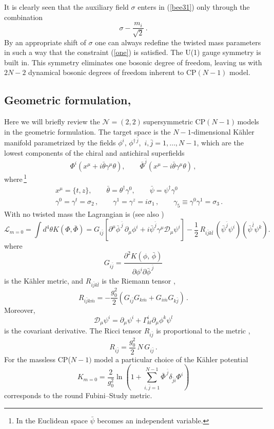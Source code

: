 \documentclass[epsfig,12pt]{article}
\def\beq{\begin{equation}}
\def\eeq{\end{equation}}
\def\beqn{\begin{eqnarray}}
\def\eeqn{\end{eqnarray}}
\newcommand{\ntt}{${\mathcal N}=(2,2)\,$}
\newcommand{\cpn}{CP$(N-1)\,$}
\newcommand{\cell}{{\mathcal L}}
\newcommand{\cde}{{\mathcal D}}
\def\beqn{\begin{eqnarray}}
\def\eeqn{\end{eqnarray}}
\def\beq{\begin{equation}}
\def\eeq{\end{equation}}
\begin{document}
It is clearly seen that the auxiliary field $\sigma$
enters in (\ref{bee31}) only through the  combination
\beq
\sigma -\frac{m_i}{\sqrt 2}\,.
\label{combi}
\eeq
By an appropriate shift of $\sigma$
one can always redefine the twisted mass parameters in such a way that the constraint
(\ref{one}) is satisfied.
The U(1) gauge symmetry is built in. This symmetry eliminates one bosonic degree of freedom, leaving us with $2N-2$ dynamical bosonic degrees of freedom inherent to CP$(N-1)$ model.



\subsection{Geometric formulation,  }

Here we will  briefly review the \ntt supersymmetric \cpn models in the
geometric formulation. 
The target space is the $N-1$-dimensional K\"ahler manifold 
parametrized by the fields $\phi^{i},\,\phi^{\dagger\,\bar j}$, $\,i,\bar j=1,\ldots,N-1$,
which are the lowest components of the chiral and antichiral superfields 
\beq
\Phi^{i}(x^{\mu}+i\bar \theta \gamma^{\mu} \theta),\qquad \bar\Phi^{\bar j}(x^{\mu}-i\bar \theta \gamma^{\mu} \theta)\,,
\label{wtpi4}
\eeq
where\,\footnote{In the Euclidean space $\bar\psi$ becomes an independent variable.}
\beqn
&&
x^{\mu}=\{t,z\},\qquad \bar \theta=\theta^{\dagger}\gamma^{0},\qquad \bar \psi=\psi^{\dagger}\gamma^{0}
\nonumber
\\[2mm]
&&\gamma^{0}=\gamma^t=\sigma_2\,,\qquad \gamma^{1}=\gamma^z = i\sigma_1\,,\qquad \gamma_{5} 
\equiv\gamma^0\gamma^1 = \sigma_3\,.
\label{wtpi5}
\eeqn
With no twisted mass the Lagrangian  is \cite{Bruno}
(see also \cite{WessBagger})
\begin{equation}
\label{eq:kinetic}
{\cell}_{m=0}= \int d^{4 }\theta K(\Phi, \bar\Phi)
=G_{i\bar j} \left[\partial^\mu \bar\phi^{\,\bar j}\, \partial_\mu\phi^{i}
+i\bar \psi^{\bar j} \gamma^{\mu} \cde_{\mu}\psi^{i}\right]
-\frac{1}{2}\,R_{i\bar jk\bar l}\,(\bar\psi^{\bar j}\psi^{i})(\bar\psi^{\bar l}\psi^{k}).
\end{equation}
where
\beq
G_{i\bar j}=\frac{\partial^{2} K(\phi,\,\bar\phi)}{\partial \phi^{i}\partial \bar\phi^{\,\bar j}}
\label{wtpi6}
\eeq
 is the K\"ahler metric, and
$R_{i\bar jk\bar l}$ is the Riemann tensor \cite{Helgason}, 
\beq
R_{i\bar{j} k\bar{m}} = - \frac{g_0^2}{2}\left(G_{i\bar{j}}G_{k\bar{m}} +
G_{i\bar{m}}G_{k\bar{j}}
\right)\,.
\label{640}
\eeq
Moreover,
$$ \cde_{\mu}\psi^{i}=
\partial_{\mu}\psi^{i}+\Gamma^{i}_{kl}\partial_{\mu} \phi^{k}\psi^{l}
$$
is the covariant derivative.
The Ricci tensor $R_{i\bar j}$ is proportional to the metric \cite{Helgason},
\beq
\label{eq:RG}
R_{i\bar{j}} = \frac{g_{0}^2}{2}\,  N \, G_{i\bar{j}}\,.
\eeq
For the massless CP($N\!-\!1)$ model 
a particular choice of the K\"ahler potential
\begin{equation}
\label{eq:kahler}
K_{m=0}=\frac{2}{g_{0}^{2}}\ln\left(1+\sum_{i,\bar j=1}^{ N-1}\bar\Phi^{\,\bar j}\delta_{\bar j i}\Phi^{i}\right)
\end{equation}
corresponds to the round Fubini--Study metric.
\end{document}
